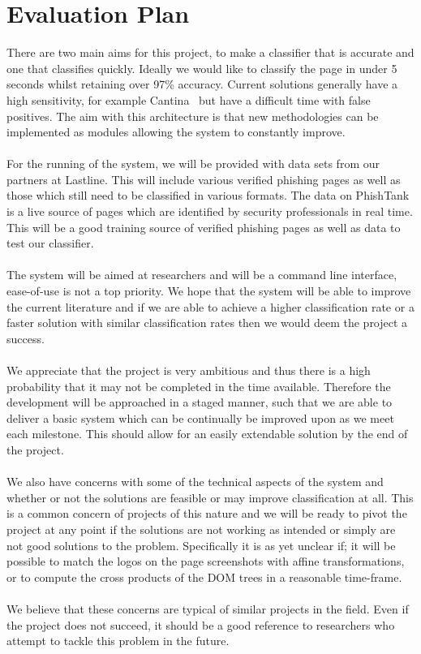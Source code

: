 \section{Evaluation Plan}
There are two main aims for this project, to make a classifier that is accurate and one that classifies quickly. Ideally we would like to classify the page in under 5 seconds whilst retaining over 97\% accuracy. Current solutions generally have a high sensitivity, for example Cantina~\cite{cantina} but have a difficult time with false positives. The aim with this architecture is that new methodologies can be implemented as modules allowing the system to constantly improve.
\\\\
For the running of the system, we will be provided with data sets from our partners at Lastline. This will include various verified phishing pages as well as those which still need to be classified in various formats. The data on PhishTank~\cite{phishtank} is a live source of pages which are identified by security professionals in real time. This will be a good training source of verified phishing pages as well as data to test our classifier.
\\\\
The system will be aimed at researchers and will be a command line interface, ease-of-use is not a top priority. We hope that the system will be able to improve the current literature and if we are able to achieve a higher classification rate or a faster solution with similar classification rates then we would deem the project a success.
\\\\
We appreciate that the project is very ambitious and thus there is a high probability that it may not be completed in the time available. Therefore the development will be approached in a staged manner, such that we are able to deliver a basic system which can be continually be improved upon as we meet each milestone. This should allow for an easily extendable solution by the end of the project.
\\\\
We also have concerns with some of the technical aspects of the system and whether or not the solutions are feasible or may improve classification at all. This is a common concern of projects of this nature and we will be ready to pivot the project at any point if the solutions are not working as intended or simply are not good solutions to the problem. Specifically it is as yet unclear if; it will be possible to match the logos on the page screenshots with affine transformations, or to compute the cross products of the DOM trees in a reasonable time-frame.
\\\\
We believe that these concerns are typical of similar projects in the field. Even if the project does not succeed, it should be a good reference to researchers who attempt to tackle this problem in the future.